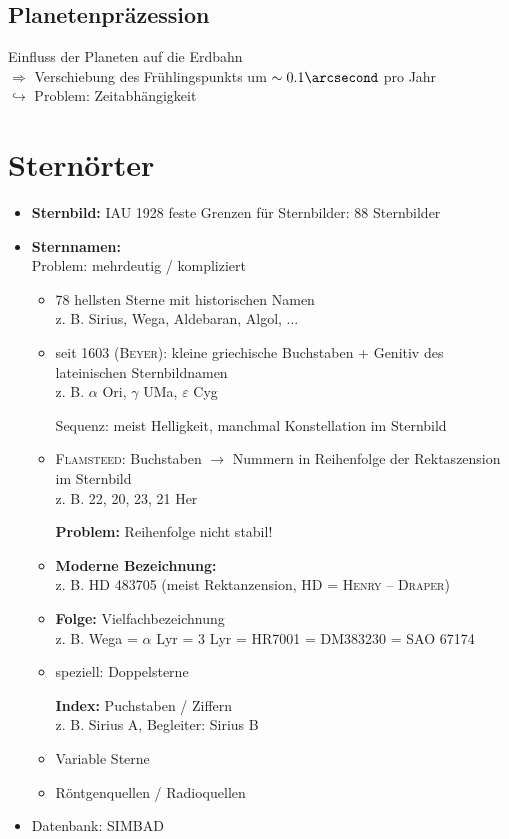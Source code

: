 \subsection{Planetenpräzession}
Einfluss der Planeten auf die Erdbahn\\
$\Rightarrow$ Verschiebung des Frühlingspunkts um $\sim 0.1\arcsecond$ pro Jahr \\
$\hookrightarrow$ Problem: Zeitabhängigkeit

\section{Sternörter}
\begin{itemize}
    \item \textbf{Sternbild:} IAU 1928 feste Grenzen für Sternbilder: 88 Sternbilder
    \item \textbf{Sternnamen:}\\
        Problem: mehrdeutig / kompliziert
        \begin{itemize}
            \item 78 hellsten Sterne mit historischen Namen\\
                z. B. Sirius, Wega, Aldebaran, Algol, ...
            \item seit 1603 (\textsc{Beyer}): kleine griechische Buchstaben + 
                Genitiv des lateinischen Sternbildnamen\\
                z. B. $\alpha$ Ori, $\gamma$ UMa, $\varepsilon$ Cyg

                Sequenz: meist Helligkeit, manchmal Konstellation im Sternbild
            \item \textsc{Flamsteed:} Buchstaben $\rightarrow$ Nummern in 
                Reihenfolge der Rektaszension im Sternbild\\
                z. B. 22, 20, 23, 21 Her

                \textbf{Problem:} Reihenfolge nicht stabil!
            \item \textbf{Moderne Bezeichnung:} \\
                z. B. HD 483705 (meist Rektanzension, HD = \textsc{Henry} -- \textsc{Draper})
            \item \textbf{Folge:} Vielfachbezeichnung\\
                z. B. Wega = $\alpha$ Lyr = 3 Lyr = HR7001 = DM383230 = SAO 67174
            \item speziell: Doppelsterne

                \textbf{Index:} Puchstaben / Ziffern \\
                z. B. Sirius A, Begleiter: Sirius B
            \item Variable Sterne
            \item Röntgenquellen / Radioquellen
        \end{itemize}
    \item Datenbank: SIMBAD
\end{itemize}

